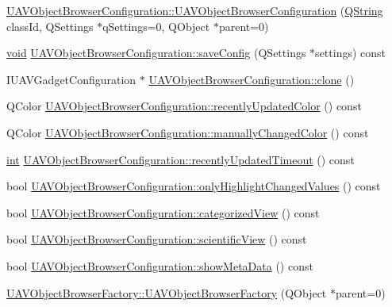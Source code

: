 \begin{DoxyCompactItemize}
\item 
\hyperlink{group___u_a_v_object_browser_plugin_ga70fd7664c3f0a9a97f0003bc04e5dc42}{U\-A\-V\-Object\-Browser\-Configuration\-::\-U\-A\-V\-Object\-Browser\-Configuration} (\hyperlink{group___u_a_v_objects_plugin_gab9d252f49c333c94a72f97ce3105a32d}{Q\-String} class\-Id, Q\-Settings $\ast$q\-Settings=0, Q\-Object $\ast$parent=0)
\item 
\hyperlink{group___u_a_v_objects_plugin_ga444cf2ff3f0ecbe028adce838d373f5c}{void} \hyperlink{group___u_a_v_object_browser_plugin_gadb33bf1275b4c9f13153755f9f333042}{U\-A\-V\-Object\-Browser\-Configuration\-::save\-Config} (Q\-Settings $\ast$settings) const 
\item 
I\-U\-A\-V\-Gadget\-Configuration $\ast$ \hyperlink{group___u_a_v_object_browser_plugin_ga0bf31a4c146a973fe414471258c40b9a}{U\-A\-V\-Object\-Browser\-Configuration\-::clone} ()
\item 
Q\-Color \hyperlink{group___u_a_v_object_browser_plugin_gabd9e62445c6dafe38aff2aa05e0b63e0}{U\-A\-V\-Object\-Browser\-Configuration\-::recently\-Updated\-Color} () const 
\item 
Q\-Color \hyperlink{group___u_a_v_object_browser_plugin_ga3c96e42ba99892a40daa0e4140285ccd}{U\-A\-V\-Object\-Browser\-Configuration\-::manually\-Changed\-Color} () const 
\item 
\hyperlink{ioapi_8h_a787fa3cf048117ba7123753c1e74fcd6}{int} \hyperlink{group___u_a_v_object_browser_plugin_ga3aabfce2aedab253f923829311c4e07d}{U\-A\-V\-Object\-Browser\-Configuration\-::recently\-Updated\-Timeout} () const 
\item 
bool \hyperlink{group___u_a_v_object_browser_plugin_gafaf541f03652cd6f57909b0e8c453695}{U\-A\-V\-Object\-Browser\-Configuration\-::only\-Highlight\-Changed\-Values} () const 
\item 
bool \hyperlink{group___u_a_v_object_browser_plugin_gadc4b65d3776b63289a8e2981af3d218b}{U\-A\-V\-Object\-Browser\-Configuration\-::categorized\-View} () const 
\item 
bool \hyperlink{group___u_a_v_object_browser_plugin_ga70ab8d21181971d5e78925921d9ce52c}{U\-A\-V\-Object\-Browser\-Configuration\-::scientific\-View} () const 
\item 
bool \hyperlink{group___u_a_v_object_browser_plugin_ga02fed63cf79eb853363190d6db4139c7}{U\-A\-V\-Object\-Browser\-Configuration\-::show\-Meta\-Data} () const 
\item 
\hyperlink{group___u_a_v_object_browser_plugin_gaff1c7d505f0ee15281d551b8b3dce992}{U\-A\-V\-Object\-Browser\-Factory\-::\-U\-A\-V\-Object\-Browser\-Factory} (Q\-Object $\ast$parent=0)

\end{DoxyCompactItemize}
